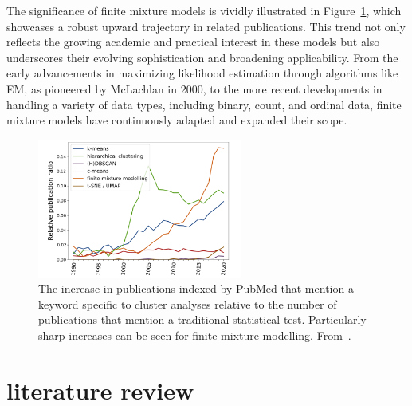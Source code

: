 \documentclass{article}
\begin{document}
The significance of finite mixture models is vividly illustrated in Figure~\ref{fig:trend}, which showcases a robust upward trajectory in related publications. This trend not only reflects the growing academic and practical interest in these models but also underscores their evolving sophistication and broadening applicability. From the early advancements in maximizing likelihood estimation through algorithms like EM, as pioneered by McLachlan in 2000, to the more recent developments in handling a variety of data types, including binary, count, and ordinal data, finite mixture models have continuously adapted and expanded their scope.

\begin{figure}[h!] %
    \centering %
    \includegraphics[width=0.6\textwidth]{images/trend.png} %
    \caption{The increase in publications indexed by PubMed that mention a keyword specific to cluster analyses relative to the number of publications 
    that mention a traditional statistical test. 
    Particularly sharp increases can be seen for finite mixture modelling.
    From~\cite{dalmaijer2022statistical}.} %
    \label{fig:trend} %
  \end{figure}


\section{literature review}

\end{document}
